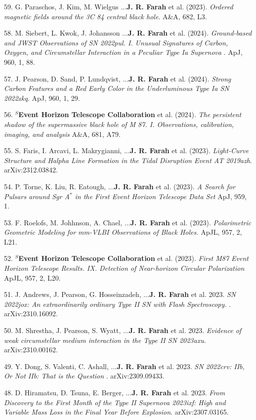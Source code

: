 \documentclass[margin,line]{res}
\begin{document}
\begin{resume}
59. G. Paraschos, J. Kim, M. Wielgus ...\textbf{J. R. Farah} et al. (2023). \textit{ Ordered magnetic fields around the 3C 84 central black hole}. A\&A, 682, L3.

58. M. Siebert, L. Kwok, J. Johansson ...\textbf{J. R. Farah} et al. (2024). \textit{Ground-based and JWST Observations of SN 2022pul. I. Unusual Signatures of Carbon, Oxygen, and Circumstellar Interaction in a Peculiar Type Ia Supernova }. ApJ, 960, 1, 88.

57. J. Pearson, D. Sand, P. Lundqvist, ...\textbf{J. R. Farah} et al. (2024). \textit{Strong Carbon Features and a Red Early Color in the Underluminous Type Ia SN 2022xkq}. ApJ, 960, 1, 29.

56. \textbf{$^S$Event Horizon Telescope Collaboration} et al. (2024). \textit{The persistent shadow of the supermassive black hole of M 87. I. Observations, calibration, imaging, and analysis } A\&A, 681, A79.

55. S. Faris, I. Arcavi, L. Makrygianni, ...\textbf{J. R. Farah} et al. (2023). \textit{Light-Curve Structure and Halpha Line Formation in the Tidal Disruption Event AT 2019azh}. arXiv:2312.03842.

54. P. Torne, K. Liu, R. Eatough, ...\textbf{J. R. Farah} et al. (2023). \textit{ A Search for Pulsars around Sgr A$^\ast$ in the First Event Horizon Telescope Data Set } ApJ, 959, 1.

53. F. Roelofs, M. Johhnson, A. Chael, ...\textbf{J. R. Farah} et al. (2023). \textit{ Polarimetric Geometric Modeling for mm-VLBI Observations of Black Holes. } ApJL, 957, 2, L21.

52. \textbf{$^S$Event Horizon Telescope Collaboration} et al. (2023). \textit{First M87 Event Horizon Telescope Results. IX. Detection of Near-horizon Circular Polarization} ApJL, 957, 2, L20.

51. J. Andrews, J. Pearson, G. Hosseinzadeh, ...\textbf{J. R. Farah} et al. 2023. \textit{ SN 2022jox: An extraordinarily ordinary Type II SN with Flash Spectroscopy. }. arXiv:2310.16092.

50. M. Shrestha, J. Pearson, S. Wyatt, ...\textbf{J. R. Farah} et al. 2023. \textit{Evidence of weak circumstellar medium interaction in the Type II SN 2023axu}. arXiv:2310.00162.

49. Y. Dong, S. Valenti, C. Ashall, ...\textbf{J. R. Farah} et al. 2023. \textit{ SN 2022crv: IIb, Or Not IIb: That is the Question }. arXiv:2309.09433.

48. D. Hiramatsu, D. Tsuna, E. Berger, ...\textbf{J. R. Farah} et al. 2023. \textit{From Discovery to the First Month of the Type II Supernova 2023ixf: High and Variable Mass Loss in the Final Year Before Explosion}. arXiv:2307.03165.


\end{resume}
\end{document}
